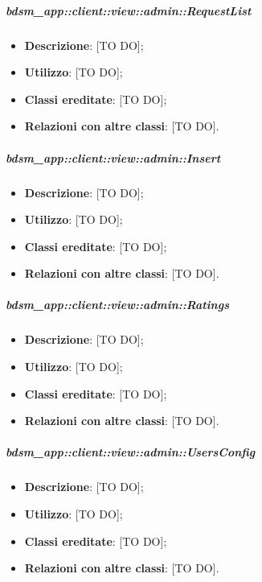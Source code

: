 			\subparagraph{bdsm\_app::client::view::admin::RequestList} %
			\label{subp:bdsm_app_client_view_admin_requestlist}
				\begin{itemize}
					\item \textbf{Descrizione}: [TO DO];
					\item \textbf{Utilizzo}: [TO DO];
					\item \textbf{Classi ereditate}: [TO DO];
					\item \textbf{Relazioni con altre classi}: [TO DO].
				\end{itemize}

			\subparagraph{bdsm\_app::client::view::admin::Insert} %
			\label{subp:bdsm_app_client_view_admin_insert}
				\begin{itemize}
					\item \textbf{Descrizione}: [TO DO];
					\item \textbf{Utilizzo}: [TO DO];
					\item \textbf{Classi ereditate}: [TO DO];
					\item \textbf{Relazioni con altre classi}: [TO DO].
				\end{itemize}

			\subparagraph{bdsm\_app::client::view::admin::Ratings} %
			\label{subp:bdsm_app_client_view_admin_ratings}
				\begin{itemize}
					\item \textbf{Descrizione}: [TO DO];
					\item \textbf{Utilizzo}: [TO DO];
					\item \textbf{Classi ereditate}: [TO DO];
					\item \textbf{Relazioni con altre classi}: [TO DO].
				\end{itemize}

			\subparagraph{bdsm\_app::client::view::admin::UsersConfig} %
			\label{subp:bdsm_app_client_view_admin_usersconfig}
				\begin{itemize}
					\item \textbf{Descrizione}: [TO DO];
					\item \textbf{Utilizzo}: [TO DO];
					\item \textbf{Classi ereditate}: [TO DO];
					\item \textbf{Relazioni con altre classi}: [TO DO].
				\end{itemize}

